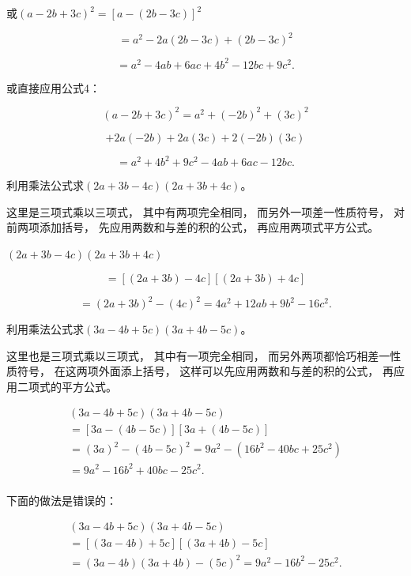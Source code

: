 或\((a - 2b + 3c)^{2} = [a - (2b - 3c)]^{2}\)

\[
= a ^{2} - 2 a (2 b - 3 c) + (2 b - 3 c) ^{2}
\]

\[
= a ^{2} - 4 a b + 6 a c + 4 b ^{2} - 12 b c + 9 c ^{2}.
\]

或直接应用公式4：

\[
(a - 2 b + 3 c) ^{2} = a ^{2} + (- 2 b) ^{2} + (3 c) ^{2}
\]

\[
+ 2 a (- 2 b) + 2 a (3 c) + 2 (- 2 b) (3 c)
\]

\[
= a ^{2} + 4 b ^{2} + 9 c ^{2} - 4 a b + 6 a c - 12 b c.
\]

 利用乘法公式求\((2a+3b-4c)(2a+3b+4c)\)。

 这里是三项式乘以三项式， 其中有两项完全相同，
而另外一项差一性质符号， 对前两项添加括号， 先应用两数和与差的积的公式，
再应用两项式平方公式。

\((2a + 3b - 4c)(2a + 3b + 4c)\)

\[
= [ (2 a + 3 b) - 4 c ] [ (2 a + 3 b) + 4 c ]
\]

\[
= (2 a + 3 b) ^{2} - (4 c) ^{2} = 4 a ^{2} + 12 a b + 9 b ^{2} - 16 c ^{2}.
\]

 利用乘法公式求\((3a-4b+5c)(3a+4b-5c)\)。

 这里也是三项式乘以三项式， 其中有一项完全相同，
而另外两项都恰巧相差一性质符号， 在这两项外面添上括号，
这样可以先应用两数和与差的积的公式， 再应用二项式的平方公式。


\[
\begin{array}{l} (3 a - 4 b + 5 c) (3 a + 4 b - 5 c) \\ = [ 3 a - (4 b - 5 c) ] [ 3 a + (4 b - 5 c) ] \\ = (3 a) ^{2} - (4 b - 5 c) ^{2} = 9 a ^{2} - (16 b ^{2} - 40 b c + 25 c ^{2}) \\ = 9 a ^{2} - 16 b ^{2} + 40 b c - 25 c ^{2}. \\ \end{array}
\]

 下面的做法是错误的：

\[
\begin{array}{l} (3 a - 4 b + 5 c) (3 a + 4 b - 5 c) \\ = [ (3 a - 4 b) + 5 c ] [ (3 a + 4 b) - 5 c ] \\ = (3 a - 4 b) (3 a + 4 b) - (5 c) ^{2} = 9 a ^{2} - 16 b ^{2} - 25 c ^{2}. \\ \end{array}
\]

